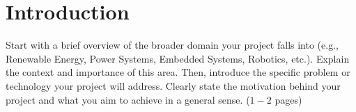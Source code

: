 
\chapter{Introduction}
\label{Chapter1}

Start with a brief overview of the broader domain your project falls into (e.g., Renewable Energy, Power Systems, Embedded Systems, Robotics, etc.). Explain the context and importance of this area. Then, introduce the specific problem or technology your project will address. Clearly state the motivation behind your project and what you aim to achieve in a general sense. ($1-2$ pages)